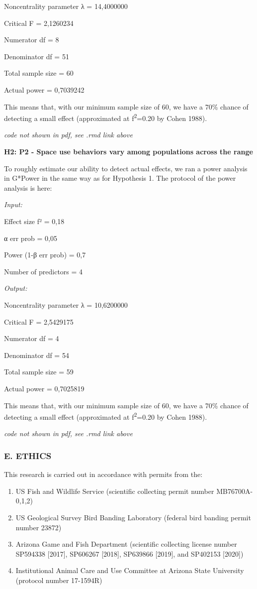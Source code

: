 \documentclass[
]{article}
\providecommand{\tightlist}{%
  \setlength{\itemsep}{0pt}\setlength{\parskip}{0pt}}
\begin{document}
Noncentrality parameter λ = 14,4000000

Critical F = 2,1260234

Numerator df = 8

Denominator df = 51

Total sample size = 60

Actual power = 0,7039242

This means that, with our minimum sample size of 60, we have a 70\%
chance of detecting a small effect (approximated at
f\textsuperscript{2}=0.20 by Cohen 1988).

\emph{code not shown in pdf, see .rmd link above}

\textbf{H2: P2 - Space use behaviors vary among populations across the
range}

To roughly estimate our ability to detect actual effects, we ran a power
analysis in G*Power in the same way as for Hypothesis 1. The protocol of
the power analysis is here:

\emph{Input:}

Effect size f² = 0,18

α err prob = 0,05

Power (1-β err prob) = 0,7

Number of predictors = 4

\emph{Output:}

Noncentrality parameter λ = 10,6200000

Critical F = 2,5429175

Numerator df = 4

Denominator df = 54

Total sample size = 59

Actual power = 0,7025819

This means that, with our minimum sample size of 60, we have a 70\%
chance of detecting a small effect (approximated at
f\textsuperscript{2}=0.20 by Cohen 1988).

\emph{code not shown in pdf, see .rmd link above}

\hypertarget{e.-ethics}{%
\subsubsection{E. ETHICS}\label{e.-ethics}}

This research is carried out in accordance with permits from the:

\begin{enumerate}
\def\labelenumi{\arabic{enumi})}
\tightlist
\item
  US Fish and Wildlife Service (scientific collecting permit number
  MB76700A-0,1,2)
\item
  US Geological Survey Bird Banding Laboratory (federal bird banding
  permit number 23872)
\item
  Arizona Game and Fish Department (scientific collecting license number
  SP594338 {[}2017{]}, SP606267 {[}2018{]}, SP639866 {[}2019{]}, and
  SP402153 {[}2020{]})
\item
  Institutional Animal Care and Use Committee at Arizona State
  University (protocol number 17-1594R)
\end{enumerate}
\end{document}
